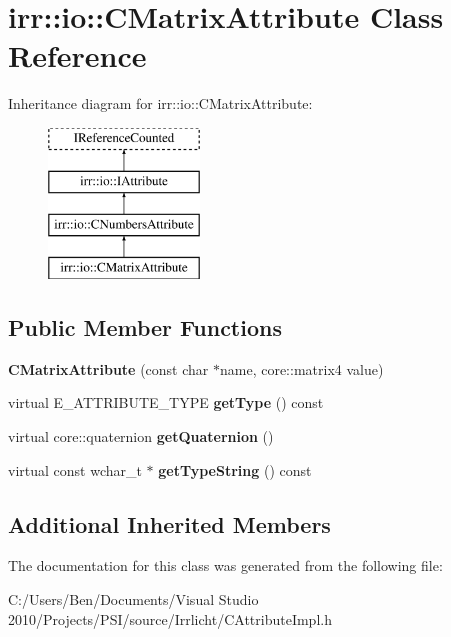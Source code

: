 \hypertarget{classirr_1_1io_1_1_c_matrix_attribute}{\section{irr\-:\-:io\-:\-:C\-Matrix\-Attribute Class Reference}
\label{classirr_1_1io_1_1_c_matrix_attribute}
}
Inheritance diagram for irr\-:\-:io\-:\-:C\-Matrix\-Attribute\-:\begin{figure}[H]
\begin{center}
\leavevmode
\includegraphics[height=4.000000cm]{classirr_1_1io_1_1_c_matrix_attribute}
\end{center}
\end{figure}
\subsection*{Public Member Functions}
\begin{DoxyCompactItemize}
\item 
\hypertarget{classirr_1_1io_1_1_c_matrix_attribute_a2f9a09a39742bcb1f81aa278834205da}{{\bfseries C\-Matrix\-Attribute} (const char $\ast$name, core\-::matrix4 value)}\label{classirr_1_1io_1_1_c_matrix_attribute_a2f9a09a39742bcb1f81aa278834205da}

\item 
\hypertarget{classirr_1_1io_1_1_c_matrix_attribute_a03ba3dcfc711a3b7c7ebc802aa07c94f}{virtual E\-\_\-\-A\-T\-T\-R\-I\-B\-U\-T\-E\-\_\-\-T\-Y\-P\-E {\bfseries get\-Type} () const }\label{classirr_1_1io_1_1_c_matrix_attribute_a03ba3dcfc711a3b7c7ebc802aa07c94f}

\item 
\hypertarget{classirr_1_1io_1_1_c_matrix_attribute_a9fa8c90c18f0646f86413ea9b102c6f2}{virtual core\-::quaternion {\bfseries get\-Quaternion} ()}\label{classirr_1_1io_1_1_c_matrix_attribute_a9fa8c90c18f0646f86413ea9b102c6f2}

\item 
\hypertarget{classirr_1_1io_1_1_c_matrix_attribute_a2f92235d2298f32ad601b8d5c8f9751f}{virtual const wchar\-\_\-t $\ast$ {\bfseries get\-Type\-String} () const }\label{classirr_1_1io_1_1_c_matrix_attribute_a2f92235d2298f32ad601b8d5c8f9751f}

\end{DoxyCompactItemize}
\subsection*{Additional Inherited Members}


The documentation for this class was generated from the following file\-:\begin{DoxyCompactItemize}
\item 
C\-:/\-Users/\-Ben/\-Documents/\-Visual Studio 2010/\-Projects/\-P\-S\-I/source/\-Irrlicht/C\-Attribute\-Impl.\-h\end{DoxyCompactItemize}
